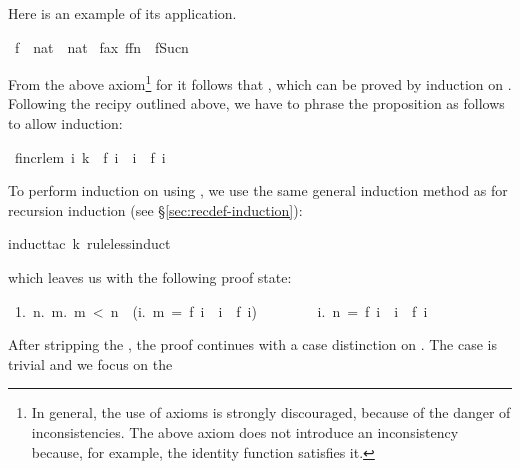 \begin{isabelle}
\begin{isamarkuptext}
\begin{quote}
\end{quote}
Here is an example of its application.%
\end{isamarkuptext}%
\ f\ {\isacharcolon}{\isacharcolon}\ {\isachardoublequote}nat\ {\isacharequal}{\isachargreater}\ nat{\isachardoublequote}\isanewline
{}\ f{\isacharunderscore}ax{\isacharcolon}\ {\isachardoublequote}f{\isacharparenleft}f{\isacharparenleft}n{\isacharparenright}{\isacharparenright}\ {\isacharless}\ f{\isacharparenleft}Suc{\isacharparenleft}n{\isacharparenright}{\isacharparenright}{\isachardoublequote}%
\begin{isamarkuptext}%
\noindent
From the above axiom\footnote{In general, the use of axioms is strongly
discouraged, because of the danger of inconsistencies. The above axiom does
not introduce an inconsistency because, for example, the identity function
satisfies it.}
for  it follows that , which can
be proved by induction on . Following the recipy outlined
above, we have to phrase the proposition as follows to allow induction:%
\end{isamarkuptext}%
\ f{\isacharunderscore}incr{\isacharunderscore}lem{\isacharcolon}\ {\isachardoublequote}{\isasymforall}i{\isachardot}\ k\ {\isacharequal}\ f\ i\ {\isasymlongrightarrow}\ i\ {\isasymle}\ f\ i{\isachardoublequote}%
\begin{isamarkuptxt}%
\noindent
To perform induction on  using , we use the same
general induction method as for recursion induction (see
\S\ref{sec:recdef-induction}):%
\end{isamarkuptxt}%
induct{\isacharunderscore}tac\ k\ rule{\isacharcolon}less{\isacharunderscore}induct{\isacharparenright}%
\begin{isamarkuptxt}%
\noindent
which leaves us with the following proof state:
\begin{isabellepar}%
\ 1.\ {\isasymAnd}\mbox{n}.\ {\isasymforall}\mbox{m}.\ \mbox{m}\ <\ \mbox{n}\ {\isasymlongrightarrow}\ ({\isasymforall}\mbox{i}.\ \mbox{m}\ =\ f\ \mbox{i}\ {\isasymlongrightarrow}\ \mbox{i}\ {\isasymle}\ f\ \mbox{i})\isanewline
\ \ \ \ \ \ \ {\isasymLongrightarrow}\ {\isasymforall}\mbox{i}.\ \mbox{n}\ =\ f\ \mbox{i}\ {\isasymlongrightarrow}\ \mbox{i}\ {\isasymle}\ f\ \mbox{i}
\end{isabellepar}%
After stripping the , the proof continues with a case
distinction on . The case  is trivial and we focus on the

\end{isamarkuptxt}
\end{isabelle}
